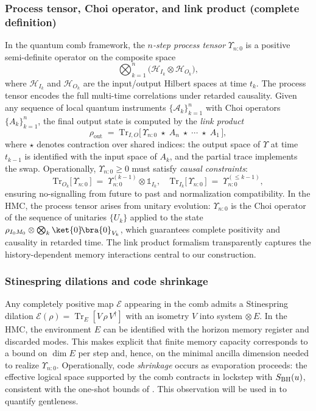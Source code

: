 \documentclass[aps,prd,preprint,onecolumn,superscriptaddress,nofootinbib,longbibliography,floatfix,11pt,showpacs,showkeys]{revtex4-2}
\newcommand{\HMC}{\textsc{HMC}\xspace}
\theoremstyle{plain}
\theoremstyle{definition}
\theoremstyle{remark}
\begin{document}
\subsubsection{Process tensor, Choi operator, and link product (complete definition)}
\label{sssec:choi-link}
In the quantum comb framework, the \emph{$n$-step process tensor} $\Upsilon_{n{:}0}$ is a positive semi-definite operator on the composite space
\[
\bigotimes_{k=1}^n \bigl(\mathcal{H}_{I_k}\otimes\mathcal{H}_{O_k}\bigr),
\]
where $\mathcal{H}_{I_k}$ and $\mathcal{H}_{O_k}$ are the input/output Hilbert spaces at time $t_k$. The process tensor encodes the full multi-time correlations under retarded causality. Given any sequence of local quantum instruments $\{\mathcal{A}_k\}_{k=1}^n$ with Choi operators $\{A_k\}_{k=1}^n$, the final output state is computed by the \emph{link product}
\begin{equation}\label{eq:link-product}
\rho_{\mathrm{out}} \;=\; \mathrm{Tr}_{I,O}\!\Big[\,\Upsilon_{n{:}0} \;\star\; A_n \;\star\; \cdots \;\star\; A_1\,\Big],
\end{equation}
where $\star$ denotes contraction over shared indices: the output space of $\Upsilon$ at time $t_{k-1}$ is identified with the input space of $A_k$, and the partial trace implements the swap. Operationally, $\Upsilon_{n{:}0}\ge 0$ must satisfy \emph{causal constraints}:
\begin{equation}
\mathrm{Tr}_{O_k}\!\bigl[\,\Upsilon_{n{:}0}\,\bigr] \;=\; \Upsilon_{n{:}0}^{(k-1)}\otimes \mathbb{1}_{I_k},
\quad \mathrm{Tr}_{I_k}\!\bigl[\,\Upsilon_{n{:}0}\,\bigr] \;=\; \Upsilon_{n{:}0}^{(\le k-1)},
\end{equation}
ensuring no-signalling from future to past and normalization compatibility. In the \HMC{}, the process tensor arises from unitary evolution: $\Upsilon_{n{:}0}$ is the Choi operator of the sequence of unitaries $\{U_k\}$ applied to the state $\rho_{I_0M_0}\otimes\bigotimes_k\ket{0}\!\bra{0}_{V_k}$, which guarantees complete positivity and causality in retarded time. The link product formalism transparently captures the history-dependent memory interactions central to our construction.


\subsubsection{Stinespring dilations and code shrinkage}
\label{sssec:dilation}
Any completely positive map $\mathcal{E}$ appearing in the comb admits a Stinespring dilation $\mathcal{E}(\rho)=\operatorname{Tr}_E[ V \, \rho \, V^\dagger ]$ with an isometry $V$ into system$\,\otimes E$. In the \HMC{}, the environment $E$ can be identified with the horizon memory register and discarded modes. This makes explicit that finite memory capacity corresponds to a bound on $\dim E$ per step and, hence, on the minimal ancilla dimension needed to realize $\Upsilon_{n{:}0}$. Operationally, code \emph{shrinkage} occurs as evaporation proceeds: the effective logical space supported by the comb contracts in lockstep with $S_{\rm BH}(u)$, consistent with the one-shot bounds of . This observation will be used in  to quantify gentleness.
\end{document}
